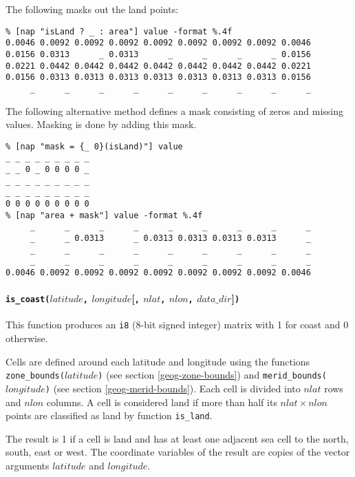 The following masks out the land points:
  \begin{verbatim}
% [nap "isLand ? _ : area"] value -format %.4f
0.0046 0.0092 0.0092 0.0092 0.0092 0.0092 0.0092 0.0092 0.0046
0.0156 0.0313      _ 0.0313      _      _      _      _ 0.0156
0.0221 0.0442 0.0442 0.0442 0.0442 0.0442 0.0442 0.0442 0.0221
0.0156 0.0313 0.0313 0.0313 0.0313 0.0313 0.0313 0.0313 0.0156
     _      _      _      _      _      _      _      _      _
\end{verbatim}

The following alternative method defines a mask consisting of
zeros and missing values. Masking is done by adding this mask.
  \begin{verbatim}
% [nap "mask = {_ 0}(isLand)"] value
_ _ _ _ _ _ _ _ _
_ _ 0 _ 0 0 0 0 _
_ _ _ _ _ _ _ _ _
_ _ _ _ _ _ _ _ _
0 0 0 0 0 0 0 0 0
% [nap "area + mask"] value -format %.4f
     _      _      _      _      _      _      _      _      _
     _      _ 0.0313      _ 0.0313 0.0313 0.0313 0.0313      _
     _      _      _      _      _      _      _      _      _
     _      _      _      _      _      _      _      _      _
0.0046 0.0092 0.0092 0.0092 0.0092 0.0092 0.0092 0.0092 0.0046
\end{verbatim}

\paragraph{\texttt{is\_coast(}$latitude$\texttt{,}
$longitude$[\texttt{,} $nlat$\texttt{,} $nlon$\texttt{,} $data\_dir$]\texttt{)}\\}
    \label{geog-is-coast}

This function produces an 
  \texttt{i8} (8-bit signed integer) matrix with 1 for coast and 0
  otherwise.

Cells are defined around each latitude and longitude using the functions 
\texttt{zone\_bounds(}$latitude$\texttt{)} (see section  \ref{geog-zone-bounds}) and
\texttt{merid\_bounds(}$longitude$\texttt{)} (see section  \ref{geog-merid-bounds}).
Each cell is divided into $nlat$ rows and $nlon$ columns.
A cell is considered land if more than half its 
$nlat \times nlon$ points are classified as land by function \texttt{is\_land}.

 The result is 1 if a cell is land and has at least one adjacent
  sea cell to the north, south, east or west. The coordinate variables
  of the result are copies of the vector arguments 
  $latitude$ and 
  $longitude$.
  
